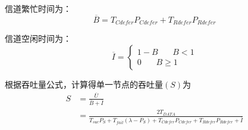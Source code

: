 信道繁忙时间为：
\begin{equation}
\overline B=T_{Cdefer}P_{Cdefer}+T_{Rdefer}P_{Rdefer}
\end{equation}

信道空闲时间为：
\begin{equation}
\overline I=\left\{
\begin{aligned}
1-B \ \ \ \ \ \ \ \ B<1\\
0\ \ \ \ \ \ \ \    B\ge 1
\end{aligned}
\right.
\end{equation}

根据吞吐量公式，计算得单一节点的吞吐量$(S)$为
\begin{equation}
\begin{aligned}
S&=\frac{\overline U}{\overline B+\overline I}\\&=\frac{2T_{DATA}}{ T_{suc}P_S+T_{fail}(\lambda-P_S )+ T_{Cdefer}P_{Cdefer}+T_{Rdefer}P_{Rdefer}+\overline I}
\end{aligned}
\end{equation}

\endinput